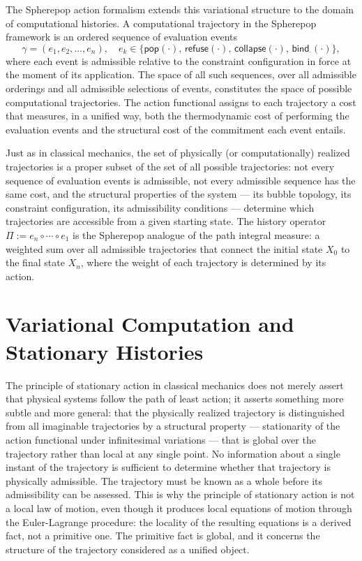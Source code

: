 \documentclass[12pt,openany]{book}
\theoremstyle{plain}
\theoremstyle{definition}
\theoremstyle{remark}
\newcommand{\spop}[1]{\mathsf{pop}\!\left(#1\right)}
\newcommand{\srefuse}[1]{\mathsf{refuse}\!\left(#1\right)}
\newcommand{\scollapse}[1]{\mathsf{collapse}\!\left(#1\right)}
\newcommand{\sbind}[2]{\mathsf{bind}_{#1}\!\left(#2\right)}
\begin{document}
The Spherepop action formalism extends this variational structure to the domain of computational histories. A computational trajectory in the Spherepop framework is an ordered sequence of evaluation events
\[
  \gamma = (e_1, e_2, \ldots, e_n), \quad e_k \in \{\spop{\cdot},\, \srefuse{\cdot},\, \scollapse{\cdot},\, \sbind{\cdot}{\cdot}\},
\]
where each event is admissible relative to the constraint configuration in force at the moment of its application. The space of all such sequences, over all admissible orderings and all admissible selections of events, constitutes the space of possible computational trajectories. The action functional assigns to each trajectory a cost that measures, in a unified way, both the thermodynamic cost of performing the evaluation events and the structural cost of the commitment each event entails.

Just as in classical mechanics, the set of physically (or computationally) realized trajectories is a proper subset of the set of all possible trajectories: not every sequence of evaluation events is admissible, not every admissible sequence has the same cost, and the structural properties of the system — its bubble topology, its constraint configuration, its admissibility conditions — determine which trajectories are accessible from a given starting state. The history operator $\Pi := e_n \circ \cdots \circ e_1$ is the Spherepop analogue of the path integral measure: a weighted sum over all admissible trajectories that connect the initial state $X_0$ to the final state $X_n$, where the weight of each trajectory is determined by its action.

\section{Variational Computation and Stationary Histories}

The principle of stationary action in classical mechanics does not merely assert that physical systems follow the path of least action; it asserts something more subtle and more general: that the physically realized trajectory is distinguished from all imaginable trajectories by a structural property — stationarity of the action functional under infinitesimal variations — that is global over the trajectory rather than local at any single point. No information about a single instant of the trajectory is sufficient to determine whether that trajectory is physically admissible. The trajectory must be known as a whole before its admissibility can be assessed. This is why the principle of stationary action is not a local law of motion, even though it produces local equations of motion through the Euler-Lagrange procedure: the locality of the resulting equations is a derived fact, not a primitive one. The primitive fact is global, and it concerns the structure of the trajectory considered as a unified object.
\end{document}
